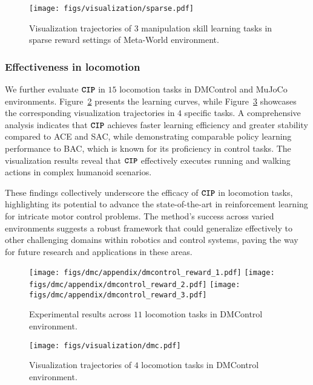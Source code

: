 \begin{figure}[t]
    \centering
    \texttt{[image: figs/visualization/sparse.pdf]}
    \caption{Visualization trajectories of $3$ manipulation skill learning tasks in sparse reward settings of Meta-World environment.}
    \label{fig:appendix_meta_sparse_vis}
\end{figure}

\subsubsection{Effectiveness in locomotion}
We further evaluate \(\texttt{\textbf{CIP}}\) in $15$ locomotion tasks in DMControl and MuJoCo environments. Figure~\ref{fig:appendix_locomotion} presents the learning curves, while Figure~\ref{fig:appendix_loco_vis} showcases the corresponding visualization trajectories in $4$ specific tasks. 
A comprehensive analysis indicates that \(\texttt{\textbf{CIP}}\) achieves faster learning efficiency and greater stability compared to ACE and SAC, while demonstrating comparable policy learning performance to BAC, which is known for its proficiency in control tasks. The visualization results reveal that \(\texttt{\textbf{CIP}}\) effectively executes running and walking actions in complex humanoid scenarios.

These findings collectively underscore the efficacy of \(\texttt{\textbf{CIP}}\) in locomotion tasks, highlighting its potential to advance the state-of-the-art in reinforcement learning for intricate motor control problems. The method's success across varied environments suggests a robust framework that could generalize effectively to other challenging domains within robotics and control systems, paving the way for future research and applications in these areas.

\begin{figure}[t]
    \centering
    \texttt{[image: figs/dmc/appendix/dmcontrol\_reward\_1.pdf]}
    \texttt{[image: figs/dmc/appendix/dmcontrol\_reward\_2.pdf]}
    \texttt{[image: figs/dmc/appendix/dmcontrol\_reward\_3.pdf]}
    \caption{Experimental results across $11$ locomotion tasks in DMControl environment.}
    \label{fig:appendix_locomotion}
\end{figure}

\begin{figure}[t]
    \centering
    \texttt{[image: figs/visualization/dmc.pdf]}
    \caption{Visualization trajectories of $4$ locomotion tasks in DMControl environment.}
    \label{fig:appendix_loco_vis}
\end{figure}
\clearpage

